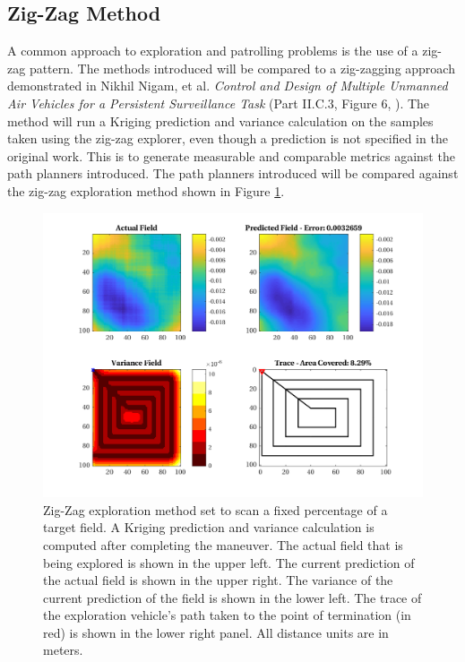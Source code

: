 \subsection{Zig-Zag Method}
A common approach to exploration and patrolling problems is the use of a zig-zag pattern. The methods introduced will be compared to a zig-zagging approach demonstrated in Nikhil Nigam, et al. \textit{Control and Design of Multiple Unmanned Air Vehicles for a Persistent Surveillance Task} (Part II.C.3, Figure 6, \cite{nigam:zigzag}). The method will run a Kriging prediction and variance calculation on the samples taken using the zig-zag explorer, even though a prediction is not specified in the original work. This is to generate measurable and comparable metrics against the path planners introduced. The path planners introduced will be compared against the zig-zag exploration method shown in Figure \ref{fig:zigzag4}.

\begin{figure}[hbt!]
    \centering
    \includegraphics[width=0.9\linewidth]{figures/hbresults/zz_10p_100x100_sf_25_seed_2.png}
    \captionsetup{skip=0.20\baselineskip}
    \ssp
    \caption{Zig-Zag exploration method set to scan a fixed percentage of a target field. A Kriging prediction and variance calculation is computed after completing the maneuver. The actual field that is being explored is shown in the upper left. The current prediction of the actual field is shown in the upper right. The variance of the current prediction of the field is shown in the lower left. The trace of the exploration vehicle's path taken to the point of termination (in red) is shown in the lower right panel. All distance units are in meters.}
    \label{fig:zigzag4}
\end{figure}
\clearpage

